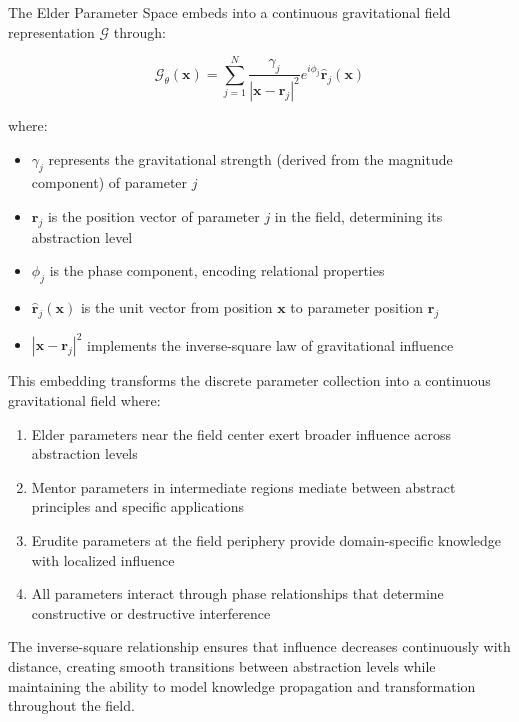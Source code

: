 \begin{theorem}
The Elder Parameter Space embeds into a continuous gravitational field representation $\mathcal{G}$ through:

\begin{equation}
\mathcal{G}_{\theta}(\mathbf{x}) = \sum_{j=1}^N \frac{\gamma_j}{|\mathbf{x} - \mathbf{r}_j|^2} e^{i\phi_j} \hat{\mathbf{r}}_j(\mathbf{x})
\end{equation}

where:
\begin{itemize}
    \item $\gamma_j$ represents the gravitational strength (derived from the magnitude component) of parameter $j$
    \item $\mathbf{r}_j$ is the position vector of parameter $j$ in the field, determining its abstraction level
    \item $\phi_j$ is the phase component, encoding relational properties
    \item $\hat{\mathbf{r}}_j(\mathbf{x})$ is the unit vector from position $\mathbf{x}$ to parameter position $\mathbf{r}_j$
    \item $|\mathbf{x} - \mathbf{r}_j|^2$ implements the inverse-square law of gravitational influence
\end{itemize}

This embedding transforms the discrete parameter collection into a continuous gravitational field where:
\begin{enumerate}
    \item Elder parameters near the field center exert broader influence across abstraction levels
    \item Mentor parameters in intermediate regions mediate between abstract principles and specific applications
    \item Erudite parameters at the field periphery provide domain-specific knowledge with localized influence
    \item All parameters interact through phase relationships that determine constructive or destructive interference
\end{enumerate}

The inverse-square relationship ensures that influence decreases continuously with distance, creating smooth transitions between abstraction levels while maintaining the ability to model knowledge propagation and transformation throughout the field.
\end{theorem}

